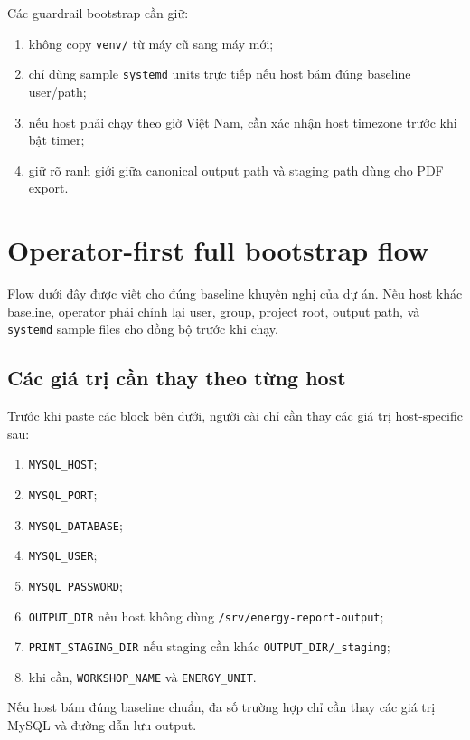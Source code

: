 Các guardrail bootstrap cần giữ:

\begin{enumerate}[label=-]
\item không copy \texttt{venv/} từ máy cũ sang máy mới;
\item chỉ dùng sample \texttt{systemd} units trực tiếp nếu host bám đúng baseline user/path;
\item nếu host phải chạy theo giờ Việt Nam, cần xác nhận host timezone trước khi bật timer;
\item giữ rõ ranh giới giữa canonical output path và staging path dùng cho PDF export.
\end{enumerate}

\section{Operator-first full bootstrap flow}

Flow dưới đây được viết cho đúng baseline khuyến nghị của dự án. Nếu host khác baseline, operator phải chỉnh lại user, group, project root, output path, và \texttt{systemd} sample files cho đồng bộ trước khi chạy.

\subsection{Các giá trị cần thay theo từng host}

Trước khi paste các block bên dưới, người cài chỉ cần thay các giá trị host-specific sau:

\begin{enumerate}[label=-]
\item \texttt{MYSQL\_HOST};
\item \texttt{MYSQL\_PORT};
\item \texttt{MYSQL\_DATABASE};
\item \texttt{MYSQL\_USER};
\item \texttt{MYSQL\_PASSWORD};
\item \texttt{OUTPUT\_DIR} nếu host không dùng \texttt{/srv/energy-report-output};
\item \texttt{PRINT\_STAGING\_DIR} nếu staging cần khác \texttt{OUTPUT\_DIR/\_staging};
\item khi cần, \texttt{WORKSHOP\_NAME} và \texttt{ENERGY\_UNIT}.
\end{enumerate}

Nếu host bám đúng baseline chuẩn, đa số trường hợp chỉ cần thay các giá trị MySQL và đường dẫn lưu output.

